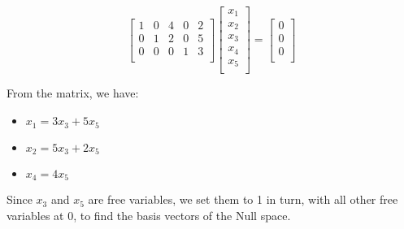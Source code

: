 \documentclass[12pt]{article}
\begin{document}
  \[
  \begin{bmatrix}
  1 & 0 & 4 & 0 & 2 \\
  0 & 1 & 2 & 0 & 5 \\
  0 & 0 & 0 & 1 & 3 \\
  \end{bmatrix} 
  \begin{bmatrix}
  x_1 \\
  x_2 \\
  x_3 \\
  x_4 \\
  x_5 \\
  \end{bmatrix}
  =
  \begin{bmatrix}
  0 \\
  0 \\
  0 \\
  \end{bmatrix}
  \]

  From the matrix, we have:
  \begin{itemize}
      \item $x_1 = 3x_3 + 5x_5$
      \item $x_2 = 5x_3 + 2x_5$
      \item $x_4 = 4x_5$
  \end{itemize}

  Since $x_3$ and $x_5$ are free variables, we set them to 1 in turn, with all other free variables at 0, to find the basis vectors of the Null space.
\end{document}
